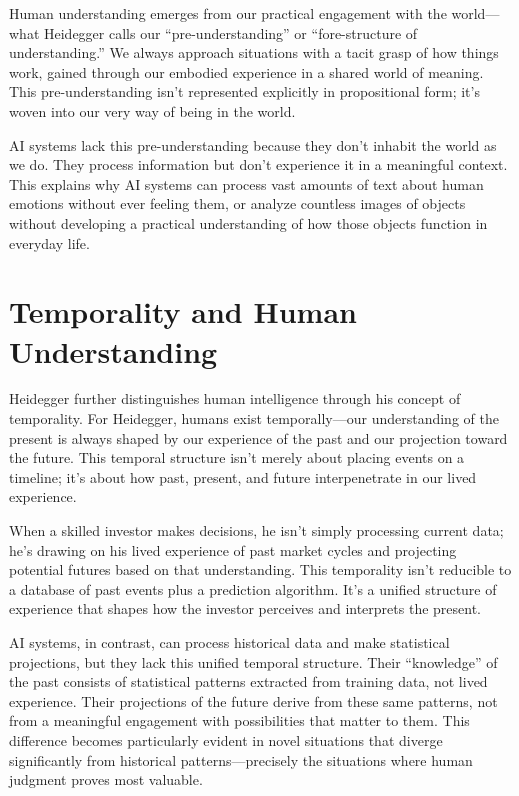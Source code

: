 \documentclass[
  Letterpaper,
]{scrbook}
\begin{document}
Human understanding emerges from our practical engagement with the
world---what Heidegger calls our ``pre-understanding'' or
``fore-structure of understanding.'' We always approach situations with
a tacit grasp of how things work, gained through our embodied experience
in a shared world of meaning. This pre-understanding isn't represented
explicitly in propositional form; it's woven into our very way of being
in the world.

AI systems lack this pre-understanding because they don't inhabit the
world as we do. They process information but don't experience it in a
meaningful context. This explains why AI systems can process vast
amounts of text about human emotions without ever feeling them, or
analyze countless images of objects without developing a practical
understanding of how those objects function in everyday life.

\section{Temporality and Human
Understanding}\label{temporality-and-human-understanding}

Heidegger further distinguishes human intelligence through his concept
of temporality. For Heidegger, humans exist temporally---our
understanding of the present is always shaped by our experience of the
past and our projection toward the future. This temporal structure isn't
merely about placing events on a timeline; it's about how past, present,
and future interpenetrate in our lived experience.

When a skilled investor makes decisions, he isn't simply processing
current data; he's drawing on his lived experience of past market cycles
and projecting potential futures based on that understanding. This
temporality isn't reducible to a database of past events plus a
prediction algorithm. It's a unified structure of experience that shapes
how the investor perceives and interprets the present.

AI systems, in contrast, can process historical data and make
statistical projections, but they lack this unified temporal structure.
Their ``knowledge'' of the past consists of statistical patterns
extracted from training data, not lived
experience. Their projections of the future derive from these same
patterns, not from a meaningful engagement with possibilities that
matter to them. This difference becomes particularly evident in novel
situations that diverge significantly from historical
patterns---precisely the situations where human
judgment proves most
valuable.
\end{document}
